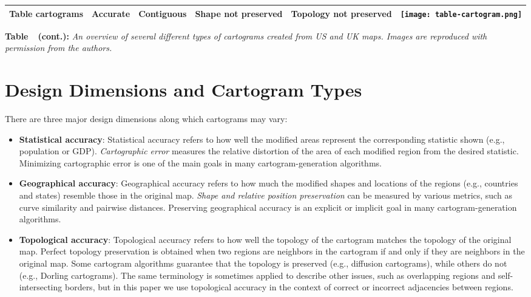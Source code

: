\documentclass{egpubl}
\begin{document}
{\begin{table*}[htbp]
\begin{tabular}{|c|c|c|c|c|c|}
\parbox{0.135\textwidth}{\centering Table cartograms \cite{EFKKMNV13}
} &
	\parbox{0.08\textwidth}{\centering Accurate} &
	\parbox{0.088\textwidth}{\centering Contiguous} &
	\parbox{0.1\textwidth}{\centering  Shape not preserved} &
	\parbox{0.155\textwidth}{\centering Topology not preserved} &
 	\parbox{0.19\textwidth}{\vspace{0.1cm}\texttt{[image: table-cartogram.png]}}\\

\hline


\end{tabular}
\vskip 6pt
\parbox{0.98\textwidth}
{
\textbf{Table~\thedummy~(cont.):} \textit{
An overview of
several different types of cartograms created from US and UK maps.
Images are reproduced with permission from the authors.
}
}
\vskip 6pt
\end{table*}

}

%
 
\section{Design Dimensions and Cartogram Types}


There are three major design dimensions along which cartograms may vary: 

\begin{itemize}
\item \textbf{Statistical accuracy}: Statistical accuracy refers to how well the modified areas represent the corresponding statistic shown (e.g., population or GDP). \textit{Cartographic error} measures the relative distortion of the area of each modified region from the desired statistic. Minimizing cartographic error is one of the main goals in many cartogram-generation algorithms.

\item \textbf{Geographical accuracy}: Geographical accuracy refers to how much the modified shapes and locations of the 
regions (e.g., countries and states) resemble those in the original map. {\em Shape and relative position preservation} can be measured by various metrics, such as curve similarity and pairwise distances. Preserving geographical accuracy is an explicit or implicit goal in many cartogram-generation algorithms.

\item \textbf{Topological accuracy}: Topological accuracy refers to how well the topology of the cartogram matches the topology of the original map. Perfect topology preservation is obtained when two regions are neighbors in the cartogram if and only if they are neighbors in the original map. 
Some cartogram algorithms guarantee that the topology is preserved (e.g., diffusion cartograms), while others do not (e.g., Dorling cartograms). The same terminology is sometimes applied to describe other issues, such as overlapping regions and self-intersecting borders, but in this paper we use topological accuracy in the context of correct or incorrect adjacencies between regions.

\end{itemize}
\end{document}
